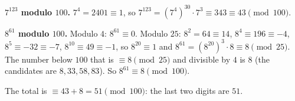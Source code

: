 \textbf{$7^{123}$ modulo $100$.} $7^4=2401\equiv1$, so $7^{123}=\left(7^4\right)^{30}\cdot7^3\equiv343\equiv43\pmod{100}$.

\textbf{$8^{61}$ modulo $100$.} Modulo $4$: $8^{61}\equiv0$. Modulo $25$: $8^2=64\equiv14$, $8^4\equiv196\equiv-4$, $8^5\equiv-32\equiv-7$, $8^{10}\equiv49\equiv-1$, so $8^{20}\equiv1$ and $8^{61}=\left(8^{20}\right)^3\cdot8\equiv8\pmod{25}$. The number below $100$ that is $\equiv8\pmod{25}$ and divisible by $4$ is $8$ (the candidates are $8,33,58,83$). So $8^{61}\equiv8\pmod{100}$.

The total is $\equiv43+8=51\pmod{100}$: the last two digits are $\boxed{51}$.
